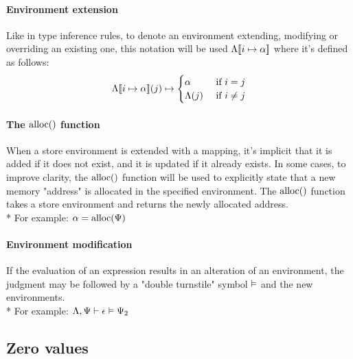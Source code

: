 \paragraph{Environment extension} Like in type inference rules, to denote an
environment extending, modifying or overriding an existing one, this notation
will be used $\Lambda[\![i\mapsto\alpha]\!]$ where it's defined as follows:
\[
	\Lambda[\![i\mapsto\alpha]\!](j) \mapsto \begin{cases}
		\alpha      &\text{ if } i = j\\
		\Lambda(j) &\text{ if } i \neq j\\
	\end{cases}
\]

\paragraph{The $\mathrm{alloc}()$ function} When a store environment is extended with
a mapping, it's implicit that it is added if it does not exist, and it is
updated if it already exists. In some cases, to improve clarity, the $\mathrm{alloc}()$
function will be used to explicitly state that a new memory "address" is
allocated in the specified environment. The $\mathrm{alloc}()$ function takes a store
environment and returns the newly allocated address.\\*
For example: $\alpha = \mathrm{alloc}(\Psi)$


\paragraph{Environment modification} If the evaluation of an expression
results in an alteration of an environment, the judgment may be followed by a
"double turnstile" symbol $\vDash$ and the new environments.\\*
For example: $\Lambda,\Psi \vdash \epsilon \vDash \Psi_2$

\clearpage

\subsection{Zero values}
\label{sec:zero_values}

